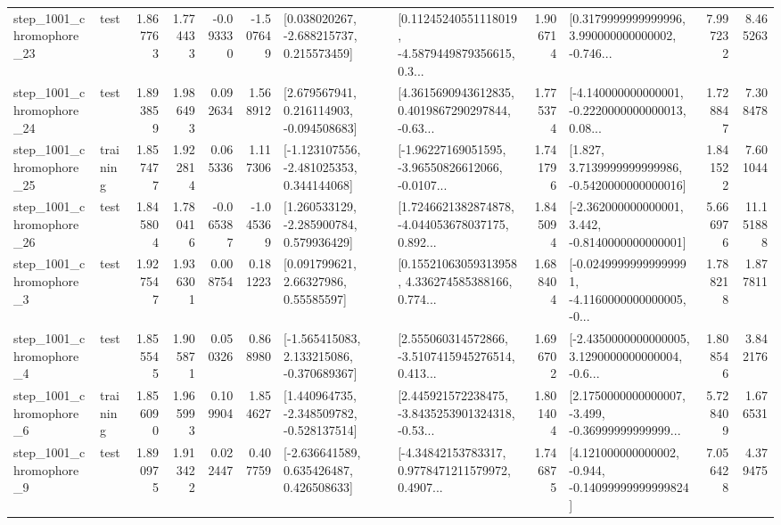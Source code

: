 \begin{tabular}{llrrrrllrlrr}
 step\_1001\_chromophore\_23 &      test &      1.867763 &    1.774433 &     -0.093330 & -1.507649 &    [0.038020267, -2.688215737, 0.215573459] &  [0.11245240551118019, -4.5879449879356615, 0.3... &       1.906714 &  [0.3179999999999996, 3.990000000000002, -0.746... &            7.997232 &          8.465263 \\
 step\_1001\_chromophore\_24 &      test &      1.893859 &    1.986493 &      0.092634 &  1.568912 &    [2.679567941, 0.216114903, -0.094508683] &  [4.3615690943612835, 0.4019867290297844, -0.63... &       1.775374 &  [-4.140000000000001, -0.2220000000000013, 0.08... &            1.728847 &          7.308478 \\
 step\_1001\_chromophore\_25 &  training &      1.857477 &    1.922814 &      0.065336 &  1.117306 &   [-1.123107556, -2.481025353, 0.344144068] &  [-1.96227169051595, -3.96550826612066, -0.0107... &       1.741796 &   [1.827, 3.7139999999999986, -0.5420000000000016] &            1.841522 &          7.601044 \\
 step\_1001\_chromophore\_26 &      test &      1.845804 &    1.780416 &     -0.065387 & -1.045369 &    [1.260533129, -2.285900784, 0.579936429] &  [1.7246621382874878, -4.044053678037175, 0.892... &       1.845094 &   [-2.362000000000001, 3.442, -0.8140000000000001] &            5.666976 &         11.151888 \\
  step\_1001\_chromophore\_3 &      test &      1.927547 &    1.936301 &      0.008754 &  0.181223 &       [0.091799621, 2.66327986, 0.55585597] &  [0.15521063059313958, 4.336274585388166, 0.774... &       1.688404 &  [-0.02499999999999991, -4.1160000000000005, -0... &            1.788218 &          1.877811 \\
  step\_1001\_chromophore\_4 &      test &      1.855545 &    1.905871 &      0.050326 &  0.868980 &   [-1.565415083, 2.133215086, -0.370689367] &  [2.555060314572866, -3.5107415945276514, 0.413... &       1.696702 &  [-2.4350000000000005, 3.1290000000000004, -0.6... &            1.808546 &          3.842176 \\
  step\_1001\_chromophore\_6 &  training &      1.856090 &    1.965993 &      0.109904 &  1.854627 &   [1.440964735, -2.348509782, -0.528137514] &  [2.445921572238475, -3.8435253901324318, -0.53... &       1.801404 &  [2.1750000000000007, -3.499, -0.36999999999999... &            5.728409 &          1.676531 \\
  step\_1001\_chromophore\_9 &      test &      1.890975 &    1.913422 &      0.022447 &  0.407759 &    [-2.636641589, 0.635426487, 0.426508633] &  [-4.34842153783317, 0.9778471211579972, 0.4907... &       1.746875 &  [4.121000000000002, -0.944, -0.14099999999999824] &            7.056428 &          4.379475 \\

\end{tabular}
